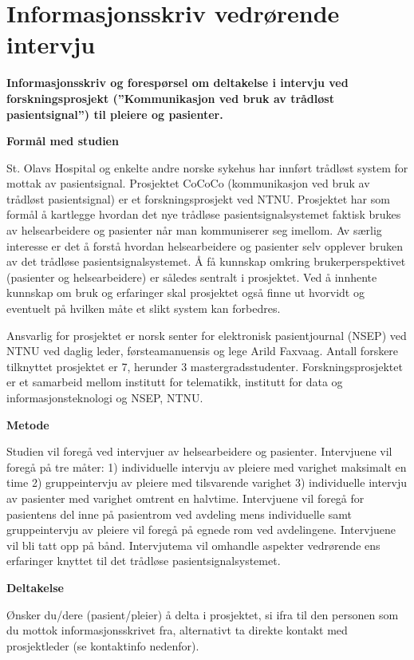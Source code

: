 \chapter{Informasjonsskriv vedrørende intervju}
\label{chp:appendix_informasjon_intervju}

\textbf{Informasjonsskriv og forespørsel om deltakelse i intervju ved forskningsprosjekt (”Kommunikasjon ved bruk av trådløst pasientsignal”) til pleiere og pasienter.}

\noindent
\textbf{Formål med studien}

\noindent
St. Olavs Hospital og enkelte andre norske sykehus har innført trådløst system for mottak av pasientsignal. Prosjektet CoCoCo (kommunikasjon ved bruk av trådløst pasientsignal) er et forskningsprosjekt ved NTNU. Prosjektet har som formål å kartlegge hvordan det nye trådløse pasientsignalsystemet faktisk brukes av helsearbeidere og pasienter når man kommuniserer seg imellom. Av særlig interesse er det å forstå hvordan helsearbeidere og pasienter selv opplever bruken av det trådløse pasientsignalsystemet. Å få kunnskap omkring brukerperspektivet (pasienter og helsearbeidere) er således sentralt i prosjektet. Ved å innhente kunnskap om bruk og erfaringer skal prosjektet også finne ut hvorvidt og eventuelt på hvilken måte et slikt system kan forbedres.

\noindent
Ansvarlig for prosjektet er norsk senter for elektronisk pasientjournal (NSEP) ved NTNU ved daglig leder, førsteamanuensis og lege Arild Faxvaag. Antall forskere tilknyttet prosjektet er 7, herunder 3 mastergradsstudenter. Forskningsprosjektet er et samarbeid mellom institutt for telematikk, institutt for data og informasjonsteknologi og NSEP, NTNU.

\noindent
\textbf{Metode}

\noindent
Studien vil foregå ved intervjuer av helsearbeidere og pasienter. Intervjuene vil foregå på tre måter: 1) individuelle intervju av pleiere med varighet maksimalt en time 2) gruppeintervju av pleiere med tilsvarende varighet 3) individuelle intervju av pasienter med varighet omtrent en halvtime. Intervjuene vil foregå for pasientens del inne på pasientrom ved avdeling mens individuelle samt gruppeintervju av pleiere vil foregå på egnede rom ved avdelingene. Intervjuene vil bli tatt opp på bånd. Intervjutema vil omhandle aspekter vedrørende ens erfaringer knyttet til det trådløse pasientsignalsystemet.

\noindent
\textbf{Deltakelse}

\noindent
Ønsker du/dere (pasient/pleier) å delta i prosjektet, si ifra til den personen som du mottok informasjonsskrivet fra, alternativt ta direkte kontakt med prosjektleder (se kontaktinfo nedenfor).

